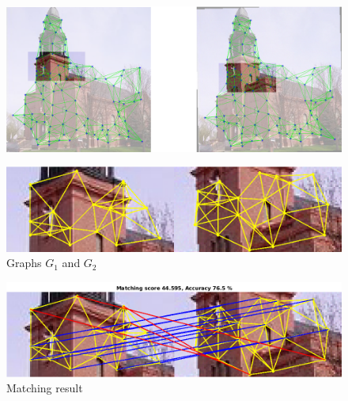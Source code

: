 \documentclass[
	fontsize=12pt,
	paper=a4,
	twoside=false,
	numbers=noenddot,
	plainheadsepline,
	toc=listof,
	toc=bibliography
]{scrartcl}
\begin{document}
\begin{figure} [htb] \centering
	\includegraphics[scale = 0.35]{test5/subregions.png}
\end{figure}
\begin{figure} [hb] \centering
	\includegraphics[scale = 0.4]{test5/subgraphs.png}
	\caption{Graphs $G_1$ and $G_2$}
\end{figure}
\begin{figure} [htb] \centering
	\includegraphics[scale = 0.4]{test5/matching_result.png}
	\caption{ Matching result}
\end{figure}
\end{document}
